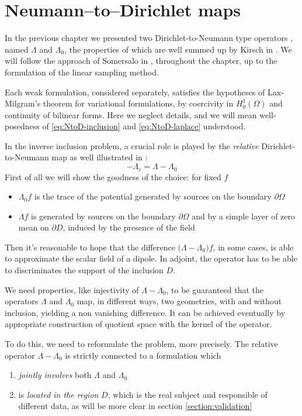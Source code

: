 \documentclass[10pt, a4paper, twoside, openright]{book}
\theoremstyle{definition}
\theoremstyle{plain}
\theoremstyle{plain}
\theoremstyle{plain}
\theoremstyle{plain}
\theoremstyle{plain}
\theoremstyle{plain}
\theoremstyle{plain}
\theoremstyle{plain}
\begin{document}
\section{Neumann--to--Dirichlet maps}
In the previous chapter we presented two Dirichlet-to-Neumann type operators , named $\Lambda$ and $\Lambda_0$, 
the properties of which are well summed up by Kirsch in \cite{kirsch:book}. 
We will follow the approach of Somersalo in \cite{somersalo:preprint}, throughout the chapter, 
up to the formulation of the linear sampling method.
\par
Each weak formulation, considered separately, satisfies the hypotheses of Lax-Milgram's theorem for 
variational formulations, by coercivity in $H^1_0(\Omega)$ and continuity of bilinear forms. 
Here we neglect details, and we will mean well-posedness of \eqref{eq:NtoD-inclusion} and \eqref{eq:NtoD-laplace} 
understood.
\par
In the inverse inclusion problem, a crucial role is played by the 
\textit{relative} Dirichlet-to-Neumann map as well illustrated in \cite{somersalo:preprint}:
\begin{equation}
 -\Lambda_r = \Lambda - \Lambda_0
\end{equation}
First of all we will show the goodness of the choice: for fixed $f$
\begin{itemize}
 \item $\Lambda_0 f$ is the trace of the potential generated by sources on the boundary $\partial \Omega$ 
 \item $\Lambda f$ is generated by sources on the boundary $\partial \Omega$ and by a simple layer of 
 zero mean on $\partial D$, induced by the presence of the field
\end{itemize}
Then it's reasonable to hope that the difference $\bigl(\Lambda-\Lambda_0\bigr)f$, in some cases, 
is able to approximate the scalar field of a dipole.
In adjoint, the operator has to be able to discriminates the support of the inclusion $D$.
\par
We need properties, like injectivity of $\Lambda - \Lambda_0$, to be guaranteed that the operators 
$\Lambda$ and $\Lambda_0$ map, in different ways, two geometries, with and without inclusion, 
yielding a non vanishing difference.
It can be achieved eventually by appropriate construction of quotient space with the kernel of the operator.
\par
To do this, we need to reformulate the problem, more precisely.
The relative operator $\Lambda - \Lambda_0$ is strictly connected to a formulation which
\begin{enumerate}
 \item \emph{jointly involves} both $\Lambda$ and $\Lambda_0$
 \item is \emph{located in the region} $D$, which is the real subject and responsible of different data, 
 as will be more clear in section \ref{section:validation}
\end{enumerate}
\end{document}
